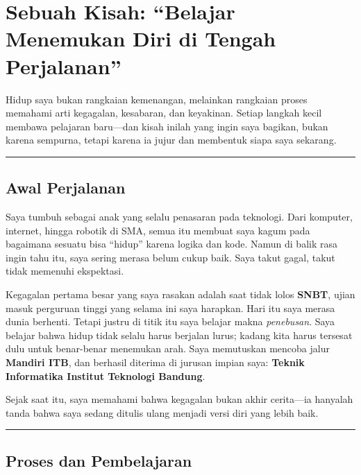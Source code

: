 \documentclass[
  letterpaper,
  DIV=11,
  numbers=noendperiod]{scrreprt}
\begin{document}
\section{\texorpdfstring{\textbf{Sebuah Kisah: ``Belajar Menemukan Diri
di Tengah
Perjalanan''}}{Sebuah Kisah: ``Belajar Menemukan Diri di Tengah Perjalanan''}}\label{sebuah-kisah-belajar-menemukan-diri-di-tengah-perjalanan}

Hidup saya bukan rangkaian kemenangan, melainkan rangkaian proses
memahami arti kegagalan, kesabaran, dan keyakinan. Setiap langkah kecil
membawa pelajaran baru---dan kisah inilah yang ingin saya bagikan, bukan
karena sempurna, tetapi karena ia jujur dan membentuk siapa saya
sekarang.

\begin{center}\rule{0.5\linewidth}{0.5pt}\end{center}

\subsection{\texorpdfstring{\textbf{Awal
Perjalanan}}{Awal Perjalanan}}\label{awal-perjalanan}

Saya tumbuh sebagai anak yang selalu penasaran pada teknologi. Dari
komputer, internet, hingga robotik di SMA, semua itu membuat saya kagum
pada bagaimana sesuatu bisa ``hidup'' karena logika dan kode. Namun di
balik rasa ingin tahu itu, saya sering merasa belum cukup baik. Saya
takut gagal, takut tidak memenuhi ekspektasi.

Kegagalan pertama besar yang saya rasakan adalah saat tidak lolos
\textbf{SNBT}, ujian masuk perguruan tinggi yang selama ini saya
harapkan. Hari itu saya merasa dunia berhenti. Tetapi justru di titik
itu saya belajar makna \emph{penebusan}. Saya belajar bahwa hidup tidak
selalu harus berjalan lurus; kadang kita harus tersesat dulu untuk
benar-benar menemukan arah. Saya memutuskan mencoba jalur
\textbf{Mandiri ITB}, dan berhasil diterima di jurusan impian saya:
\textbf{Teknik Informatika Institut Teknologi Bandung}.

Sejak saat itu, saya memahami bahwa kegagalan bukan akhir cerita---ia
hanyalah tanda bahwa saya sedang ditulis ulang menjadi versi diri yang
lebih baik.

\begin{center}\rule{0.5\linewidth}{0.5pt}\end{center}

\subsection{\texorpdfstring{\textbf{Proses dan
Pembelajaran}}{Proses dan Pembelajaran}}\label{proses-dan-pembelajaran}
\end{document}
